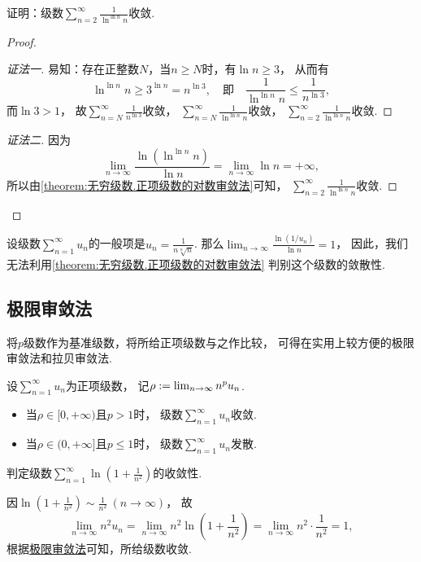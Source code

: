 \begin{example}
证明：级数\(\sum_{n=2}^\infty \frac1{\ln^{\ln n} n}\)收敛.
\begin{proof}\let\qed\relax
\begin{proof}[证法一]
易知：存在正整数\(N\)，当\(n \geq N\)时，有\(\ln n \geq 3\)，
从而有\[
	\ln^{\ln n} n
	\geq 3^{\ln n}
	= n^{\ln3},%
	\quad\text{即}\quad
	\frac1{\ln^{\ln n} n} \leq \frac1{n^{\ln3}},
\]
而\(\ln3>1\)，
故\(\sum_{n=N}^\infty \frac1{n^{\ln3}}\)收敛，
\(\sum_{n=N}^\infty \frac1{\ln^{\ln n} n}\)收敛，
\(\sum_{n=2}^\infty \frac1{\ln^{\ln n} n}\)收敛.
\end{proof}
\begin{proof}[证法二]
因为\[
	\lim_{n\to\infty} \frac{\ln(\ln^{\ln n} n)}{\ln n}
	= \lim_{n\to\infty} \ln n
	= +\infty,
\]
所以由\cref{theorem:无穷级数.正项级数的对数审敛法}可知，
\(\sum_{n=2}^\infty \frac1{\ln^{\ln n} n}\)收敛.
\end{proof}
\end{proof}
\end{example}

\begin{remark}
设级数\(\sum_{n=1}^\infty u_n\)的一般项是\(u_n = \frac1{n\sqrt[n]{n}}\).
那么\(\lim_{n\to\infty} \frac{\ln(1/u_n)}{\ln n} = 1\)，
因此，我们无法利用\cref{theorem:无穷级数.正项级数的对数审敛法} 判别这个级数的敛散性.
\end{remark}

\subsection{极限审敛法}
将\(p\)级数作为基准级数，将所给正项级数与之作比较，
可得在实用上较方便的极限审敛法和拉贝审敛法.
\begin{theorem}[极限审敛法]\label{theorem:无穷级数.正项级数的极限审敛法}
设\(\sum_{n=1}^\infty u_n\)为正项级数，
记\(\rho := \lim_{n\to\infty} n^p u_n\).
\begin{itemize}
	\item 当\(\rho\in[0,+\infty)\)且\(p>1\)时，
	级数\(\sum_{n=1}^\infty u_n\)收敛.

	\item 当\(\rho\in(0,+\infty]\)且\(p\leq1\)时，
	级数\(\sum_{n=1}^\infty u_n\)发散.
\end{itemize}
\end{theorem}

\begin{example}
判定级数\(\sum_{n=1}^\infty \ln(1+\frac{1}{n^2})\)的收敛性.
\begin{solution}
因\(\ln(1+\frac{1}{n^2}) \sim \frac{1}{n^2}\ (n\to\infty)\)，
故\[
	\lim_{n\to\infty} n^2 u_n
	= \lim_{n\to\infty} n^2 \ln(1+\frac{1}{n^2})
	= \lim_{n\to\infty} n^2 \cdot \frac{1}{n^2}
	= 1,
\]
根据\hyperref[theorem:无穷级数.正项级数的极限审敛法]{极限审敛法}可知，所给级数收敛.
\end{solution}
\end{example}

